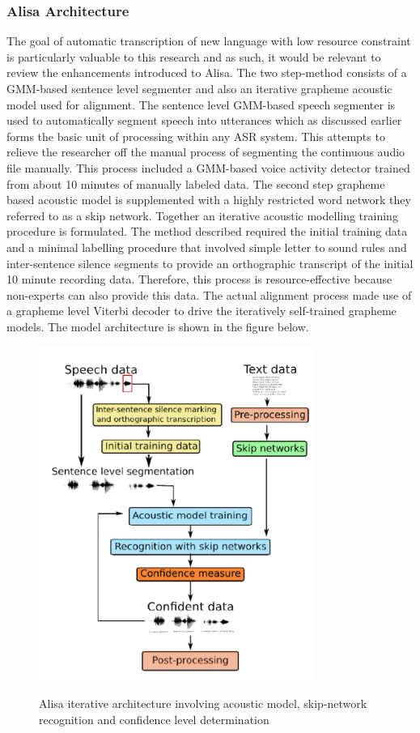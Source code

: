 \subsubsection{Alisa Architecture}
The goal of automatic transcription of new language with low resource constraint is particularly valuable to this research and as such, it would be relevant to review the enhancements introduced to Alisa.  The two step-method consists of a GMM-based sentence level segmenter and also an iterative grapheme acoustic model used for alignment.  The sentence level GMM-based speech segmenter is used to automatically segment speech into utterances which as discussed earlier forms the basic unit of processing within any ASR system.  This attempts to relieve the researcher off the manual process of segmenting the continuous audio file manually. This process included a GMM-based voice activity detector trained from about 10 minutes of manually labeled data. The second step grapheme based acoustic model is supplemented with a highly restricted word network they referred to as a skip network.  Together an iterative acoustic modelling training procedure is formulated.  The method described required the initial training data and a minimal labelling procedure that involved simple letter to sound rules and inter-sentence silence segments to provide an orthographic transcript of the initial 10 minute recording data.  Therefore, this process is resource-effective because non-experts can also provide this data.  The actual alignment process made use of a grapheme level Viterbi decoder to drive the iteratively self-trained grapheme models.  The model architecture is shown in the figure below.
\begin{figure}
\centering
  \includegraphics[width=9cm]{thesis/images/alisa}\\
  \caption{Alisa iterative architecture \citep{stan2016alisa} involving acoustic model, skip-network recognition and confidence level determination}\label{fig_c3_alisa00}
\end{figure}

